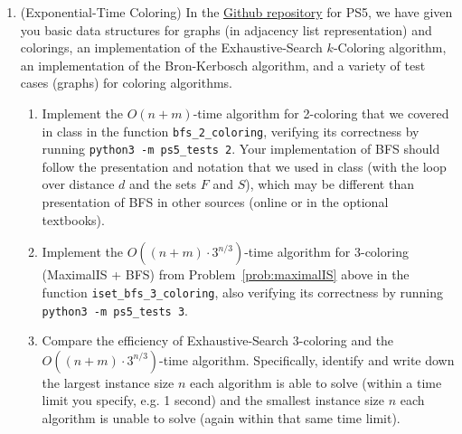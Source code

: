 \documentclass[11pt]{article}
\begin{document}
\begin{enumerate}
 \item (Exponential-Time Coloring) 
  In the \href{https://github.com/Harvard-CS-120/cs120/tree/main/fall2022/psets}{Github repository} for PS5, we have given you basic data structures for graphs (in adjacency list representation) and colorings, an implementation of the Exhaustive-Search $k$-Coloring algorithm, 
  an implementation of the Bron-Kerbosch algorithm, and a variety of test cases (graphs) for coloring algorithms. 

  \begin{enumerate}
      \item Implement the $O(n+m)$-time algorithm for 2-coloring that we covered in class in the function \texttt{bfs\_2\_coloring}, verifying its correctness by running \texttt{python3 -m ps5\_tests 2}.
        Your implementation of BFS should follow the presentation and notation that we used in class (with the loop over distance $d$ and the sets $F$ and $S$), which may be different than presentation of BFS in other sources (online or in the optional textbooks). 
        
      \item Implement the $O((n+m)\cdot 3^{n/3})$-time algorithm for 3-coloring (MaximalIS + BFS) from Problem~\ref{prob:maximalIS} above in the function \texttt{iset\_bfs\_3\_coloring}, also verifying its correctness by running \texttt{python3 -m ps5\_tests 3}. \label{part:TbT}
    
    \item Compare the efficiency of Exhaustive-Search 3-coloring and the $O((n+m)\cdot 3^{n/3})$-time algorithm. Specifically, identify and write down the largest instance size $n$ each algorithm is able to solve (within a time limit you specify, e.g. 1 second) and the smallest instance size $n$ each algorithm is unable to solve (again within that same time limit). 
    

\end{enumerate}
\end{enumerate}
\end{document}
